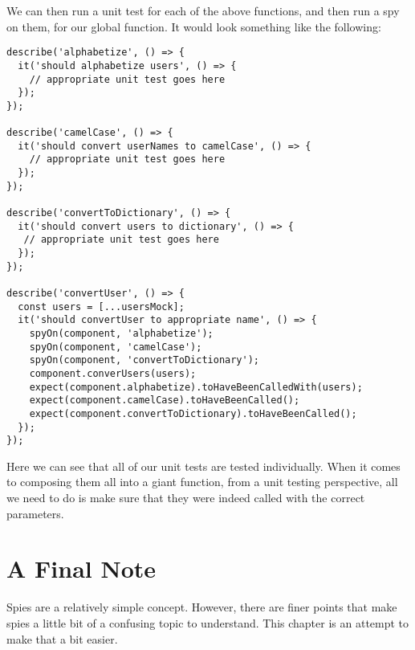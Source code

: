 
We can then run a unit test for each of the above functions, and then run a spy
on them, for our global function. It would look something like the following:

\begin{lstlisting}
describe('alphabetize', () => {
  it('should alphabetize users', () => {
    // appropriate unit test goes here
  });
});

describe('camelCase', () => {
  it('should convert userNames to camelCase', () => {
    // appropriate unit test goes here
  });
});

describe('convertToDictionary', () => {
  it('should convert users to dictionary', () => {
   // appropriate unit test goes here
  });
});

describe('convertUser', () => {
  const users = [...usersMock];
  it('should convertUser to appropriate name', () => {
    spyOn(component, 'alphabetize');
    spyOn(component, 'camelCase');
    spyOn(component, 'convertToDictionary');
    component.converUsers(users);
    expect(component.alphabetize).toHaveBeenCalledWith(users);
    expect(component.camelCase).toHaveBeenCalled();
    expect(component.convertToDictionary).toHaveBeenCalled();
  });
});
\end{lstlisting}

Here we can see that all of our unit tests are tested individually. When it
comes to composing them all into a giant function, from a unit testing
perspective, all we need to do is make sure that they were indeed called with
the correct parameters.

\section{ A Final Note }
Spies are a relatively simple concept. However, there are finer points that
make spies a little bit of a confusing topic to understand. This chapter is an
attempt to make that a bit easier. 
